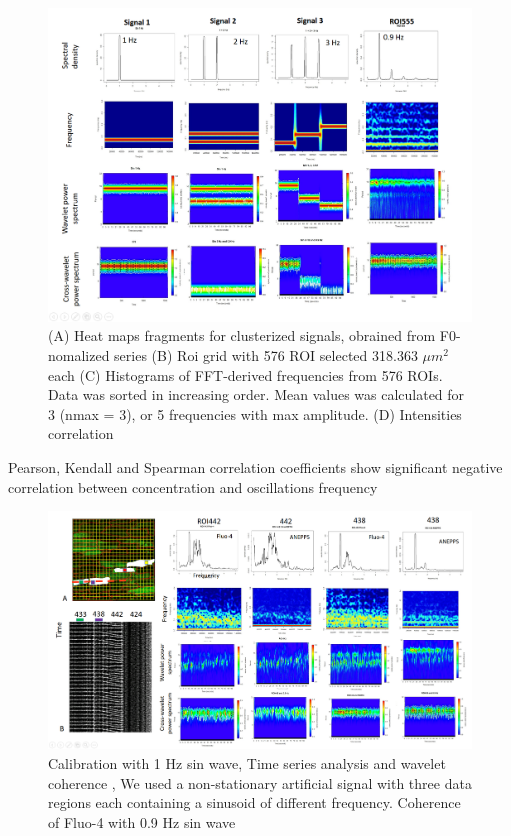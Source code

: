 \documentclass{biophys-new}
\begin{document}
\begin{figure}
    \includegraphics[width=0.9\linewidth]{fig6.png}
    \caption{(A) Heat maps fragments for clusterized signals, obrained from F0-nomalized series (B) Roi grid with 576 ROI selected 318.363 $\mu m^2$ each (C) Histograms of FFT-derived frequencies from 576 ROIs. Data was sorted in increasing order. Mean values was calculated for 3 (nmax = 3), or 5 frequencies with max amplitude. (D) Intensities correlation}
    \label{fig:fig6}
\end{figure}


Pearson, Kendall and Spearman correlation coefficients show significant negative correlation between  concentration and  oscillations frequency


\begin{figure}
    \includegraphics[width=0.9\linewidth]{fig7.png}
    \caption{Calibration with 1 Hz sin wave, Time series analysis and wavelet coherence , We used a non-stationary artificial signal with three data regions each containing a sinusoid of different frequency. Coherence of Fluo-4 with 0.9 Hz sin wave }
    \label{fig:fig7}
\end{figure}
\end{document}
